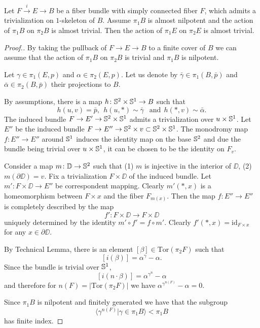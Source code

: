 \documentclass{amsart}
\begin{document}
\begin{claim}
Let $F\xrightarrow{i} E\to B$ be a fiber bundle with 
simply connected fiber $F$, which admits a trivialization on $1$-skeleton of $B$. Assume $\pi_1B$ is almost nilpotent 
and the action of $\pi_1B$ on $\pi_2B$ is almost trivial. 
Then  the action of $\pi_1E$ on $\pi_2E$ is almost trivial.
\end{claim}

\begin{proof}[Proof.] 
By taking the pullback of $F\to E\to B$ to a finite cover of $B$ we can assume that  the action of $\pi_1B$ on $\pi_2B$ is trivial and $\pi_1B$ is nilpotent.

Let $\gamma\in \pi_1(E,p)$ and $\alpha\in \pi_2(E,p)$. 
Let us denote by $\bar\gamma\in \pi_1(B,\bar p)$ and 
$\bar\alpha\in \pi_2(B,\bar p)$ their projections to $B$.

By assumptions, there is a map
$h\colon {\Bbb S}^2\times {\Bbb S}^1\to B$ such that 
$$h(u,v)=\bar p,\ \ 
h(u,*)\sim\bar\gamma\ \ \text{ and}\ \ 
h(*,v)\sim\bar\alpha.$$
The induced bundle $F\to E'\to {\Bbb S}^2\times {\Bbb S}^1$ admits a 
trivialization over $u\times {\Bbb S}^1$.
Let $E''$ be the  induced bundle $F\to E''\to {\Bbb S}^2\times v\subset {\Bbb S}^2\times {\Bbb S}^1$.
The  monodromy map $f\colon E''\to E''$ around ${\Bbb S}^1$
induces the  identity map on the base ${\Bbb S}^2$ 
and due the bundle being trivial  over $u\times {\Bbb S}^1$,
it  can be chosen to be the identity on $F_v$.

Consider a map $m\colon \mathbb{D}\to {\Bbb S}^2$ such that 
(1) $m$ is injective in the interior of $\DD$, 
(2) $m(\partial \DD)=v$.
Fix a trivialization 
$F\times \DD$ of the induced bundle. 
Let 
$m'\colon F\times \DD\to E''$ be correspondent mapping. 
Clearly 
$m'(*,x)$ is a homeomorphism  between $F\times x$ and the fiber $F_{m(x)}$.
Then the map $f\colon E''\to E''$ is completely described by the map 
$$f'\colon F\times \DD\to F\times \DD $$ 
uniquely determined  by the  identity
$m'\circ f'=f\circ m'$. 
Clearly $f'(*,x)=\mathrm{id}_{F\times x}$ 
for any $x\in\partial \DD$.

By Technical Lemma, there is an element 
$[\beta]\in \mathrm{Tor}(\pi_2F)$ such that 
\[[i(\beta)]=\alpha^\gamma-\alpha.\]
Since the bundle is trivial over ${\Bbb S}^1$,
\[[i(n\cdot \beta)]=\alpha^{\gamma^n}-\alpha\] and therefore for $n(F)=|\mathrm{Tor}(\pi_2F)|$ we have 
$\alpha^{\gamma^{n(F)}}-\alpha=0$. 

Since $\pi_1B$ is nilpotent and finitely generated we have that the subgroup  \[\langle\gamma^{n(F)}|\gamma\in \pi_1B\rangle<\pi_1B\] 
has finite index.
\end{proof}
\end{document}
